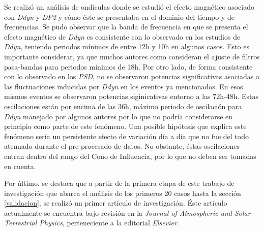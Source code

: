 Se realizó un análisis de ondículas donde se estudió el efecto magnético asociado con \emph{Ddyn} y \emph{DP2} y cómo éste se presentaba en el dominio del tiempo y de frecuencias. Se pudo observar que la banda de frecuencia en que se presenta el efecto magnético de \emph{Ddyn} es consistente con lo observado en los estudios de \emph{Ddyn}, teniendo periodos mínimos de entre 12h y 10h en algunos casos. Esto es importante considerar, ya que muchos autores como \cite{amory2020_filtros, ionos1} consideran el ajuste de filtros pasa-bandas para periodos mínimos de 18h. Por otro lado, de forma consistente con lo observado en los \emph{PSD}, no se observaron potencias significativas asociadas a las fluctuaciones inducidas por \emph{Ddyn} en los eventos ya mencionados. En esos mismos eventos se observaron potencias siginicativas entorno a las 72h-48h. Estas oscilaciones están por encima de las 36h, máximo periodo de oscilación para \emph{Ddyn} manejado por algunos autores por lo que no podría considerarse en principio como parte de este fenómeno. Una posible hipótesis que explica este fenómeno sería un persistente efecto de variación día a día que no fue del todo atenuado durante el pre-procesado de datos. No obstante, éstas oscilaciones entran dentro del rango del Cono de Influencia, por lo que no deben ser tomadas en cuenta. 
\vspace{1 em}

Por último, se destaca que a partir de la primera etapa de este trabajo de investigación que abarca el análisis de los primeros 20 casos hasta la sección \ref{validacion}, se realizó un primer artículo de investigación. Éste artículo actualmente se encuentra bajo revisión en la \textit{Journal of Atmospheric and Solar-Terrestrial Physics}, perteneciente a la editorial \textit{Elsevier}. 


